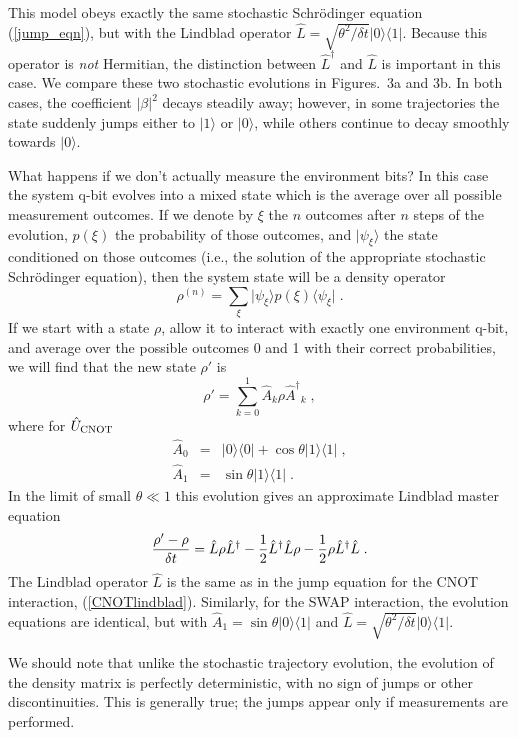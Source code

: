 \documentclass[12pt]{article}
\def\bra#1{{\langle #1 |}}
\def\ket#1{{| #1 \rangle}}
\def\U{{\hat U}}
\def\A{{\hat A}}
\def\Adag{{\hat A^\dagger}}
\def\L{{\hat L}}
\def\Ldag{{\hat L^\dagger}}
\begin{document}
This model obeys exactly the same stochastic Schr\"odinger equation
(\ref{jump_eqn}), but with the Lindblad operator
$\L = \sqrt{\theta^2/\delta t}\ket0\bra1$.  Because this operator
is {\it not} Hermitian, the distinction between $\Ldag$ and $\L$ is important
in this case.
We compare these two stochastic evolutions in Figures.~3a and 3b.  In both
cases, the coefficient $|\beta|^2$ decays steadily away; however, in
some trajectories the state suddenly jumps either to $\ket1$ or $\ket0$,
while others continue to decay smoothly towards $\ket0$.

What happens if we don't actually measure the environment bits?  In this
case the system q-bit evolves into a mixed state which is the average over
all possible measurement outcomes.  If we denote by $\xi$ the $n$ outcomes
after $n$ steps of the evolution, $p(\xi)$ the probability of those outcomes,
and $\ket{\psi_\xi}$ the state conditioned on those outcomes (i.e., the
solution of the appropriate stochastic Schr\"odinger equation), then the
system state will be a density operator
\begin{equation}
\rho^{(n)} = \sum_\xi \ket{\psi_\xi} p(\xi) \bra{\psi_\xi} \;.
\end{equation}
If we start with a state $\rho$, allow it to interact with exactly
one environment q-bit, and average over the possible outcomes
0 and 1 with their correct probabilities, we will find that the new state
$\rho'$ is
\begin{equation}
\rho' = \sum_{k=0}^1 \A_k \rho \Adag_k \;,
\label{rhoprime}
\end{equation}
where for $\U_{\rm CNOT}$
\begin{eqnarray}
\A_0 &=& \ket0\bra0 + \cos\theta \ket1\bra1 \;, \nonumber\\
\A_1 &=& \sin\theta \ket1\bra1 \;.
\label{ucnot1}
\end{eqnarray}
In the limit of small $\theta\ll1$ this evolution gives an approximate
Lindblad master equation
\begin{equation}
{{\rho' - \rho}\over\delta t} =
  \L \rho \Ldag - {1\over2} \Ldag\L \rho
  - {1\over2} \rho \Ldag\L \;.
\label{mean_lindblad}
\end{equation}
The Lindblad operator $\L$ is the same as in the jump equation for
the CNOT interaction, (\ref{CNOTlindblad}).  Similarly, for
the SWAP interaction, the evolution equations are
identical, but with $\A_1 = \sin\theta \ket0\bra1$ and
$\L = \sqrt{\theta^2/\delta t}\ket0\bra1$.

We should note that unlike the stochastic trajectory evolution, the
evolution of the density matrix is perfectly deterministic, with no sign
of jumps or other discontinuities.  This is generally true; the jumps
appear only if measurements are performed.
\end{document}
